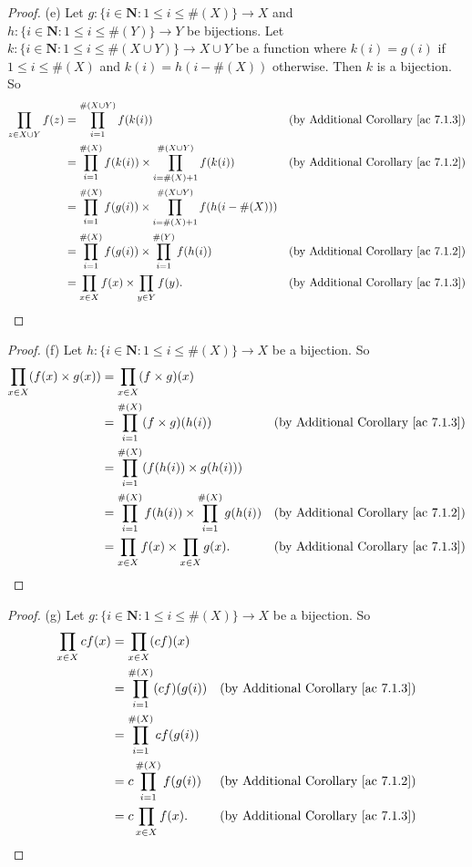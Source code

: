 \begin{proof}{(e)}
Let \(g : \{i \in \mathbf{N} : 1 \leq i \leq \#(X)\} \to X\) and \(h : \{i \in \mathbf{N} : 1 \leq i \leq \#(Y)\} \to Y\) be bijections.
Let \(k : \{i \in \mathbf{N} : 1 \leq i \leq \#(X \cup Y)\} \to X \cup Y\) be a function where \(k(i) = g(i)\) if \(1 \leq i \leq \#(X)\) and \(k(i) = h(i - \#(X))\) otherwise.
Then \(k\) is a bijection.
So
\begin{align*}
\prod_{z \in X \cup Y} f(z) &= \prod_{i = 1}^{\#(X \cup Y)} f(k(i)) & \text{(by Additional Corollary \ref{ac 7.1.3})} \\
&= \prod_{i = 1}^{\#(X)} f(k(i)) \times \prod_{i = \#(X) + 1}^{\#(X \cup Y)} f(k(i)) & \text{(by Additional Corollary \ref{ac 7.1.2})} \\
&= \prod_{i = 1}^{\#(X)} f(g(i)) \times \prod_{i = \#(X) + 1}^{\#(X \cup Y)} f(h(i - \#(X))) \\
&= \prod_{i = 1}^{\#(X)} f(g(i)) \times \prod_{i = 1}^{\#(Y)} f(h(i)) & \text{(by Additional Corollary \ref{ac 7.1.2})} \\
&= \prod_{x \in X} f(x) \times \prod_{y \in Y} f(y). & \text{(by Additional Corollary \ref{ac 7.1.3})}
\end{align*}
\end{proof}

\begin{proof}{(f)}
Let \(h : \{i \in \mathbf{N} : 1 \leq i \leq \#(X)\} \to X\) be a bijection.
So
\begin{align*}
\prod_{x \in X} (f(x) \times g(x)) &= \prod_{x \in X} (f \times g)(x) \\
&= \prod_{i = 1}^{\#(X)} (f \times g)(h(i)) & \text{(by Additional Corollary \ref{ac 7.1.3})} \\
&= \prod_{i = 1}^{\#(X)} (f(h(i)) \times g(h(i))) \\
&= \prod_{i = 1}^{\#(X)} f(h(i)) \times \prod_{i = 1}^{\#(X)} g(h(i)) & \text{(by Additional Corollary \ref{ac 7.1.2})} \\
&= \prod_{x \in X} f(x) \times \prod_{x \in X} g(x). & \text{(by Additional Corollary \ref{ac 7.1.3})}
\end{align*}
\end{proof}

\begin{proof}{(g)}
Let \(g : \{i \in \mathbf{N} : 1 \leq i \leq \#(X)\} \to X\) be a bijection.
So
\begin{align*}
\prod_{x \in X} cf(x) &= \prod_{x \in X} (cf)(x) \\
&= \prod_{i = 1}^{\#(X)} (cf)(g(i)) & \text{(by Additional Corollary \ref{ac 7.1.3})} \\
&= \prod_{i = 1}^{\#(X)} cf(g(i)) \\
&= c\prod_{i = 1}^{\#(X)} f(g(i)) & \text{(by Additional Corollary \ref{ac 7.1.2})} \\
&= c\prod_{x \in X} f(x). & \text{(by Additional Corollary \ref{ac 7.1.3})}
\end{align*}
\end{proof}

